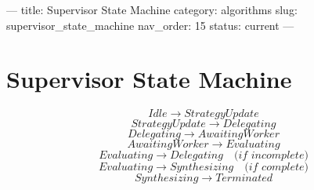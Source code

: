 ---
title: Supervisor State Machine
category: algorithms
slug: supervisor_state_machine
nav_order: 15
status: current
---

\section{Supervisor State Machine}

\[
Idle \rightarrow StrategyUpdate
\]
\[
StrategyUpdate \rightarrow Delegating
\]
\[
Delegating \rightarrow AwaitingWorker
\]
\[
AwaitingWorker \rightarrow Evaluating
\]
\[
Evaluating \rightarrow Delegating \quad \textit{(if incomplete)}
\]
\[
Evaluating \rightarrow Synthesizing \quad \textit{(if complete)}
\]
\[
Synthesizing \rightarrow Terminated
\]

